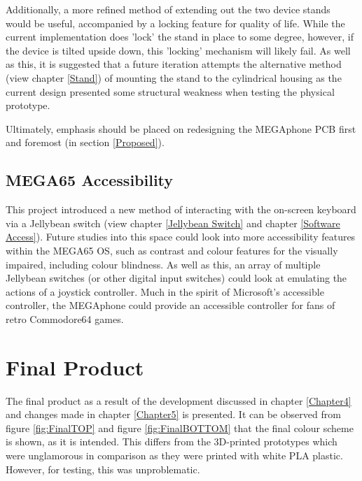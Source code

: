 Additionally, a more refined method of extending out the two device stands would be useful, accompanied by a locking feature for quality of life.
While the current implementation does 'lock' the stand in place to some degree, however, if the device is tilted upside down, this 'locking' mechanism will likely fail.
As well as this, it is suggested that a future iteration attempts the alternative method (view chapter \ref{Stand}) of mounting the stand to the cylindrical housing as the current design presented some structural weakness when testing the physical prototype.

Ultimately, emphasis should be placed on redesigning the MEGAphone PCB first and foremost (in section \ref{Proposed}).

\subsection{MEGA65 Accessibility}

This project introduced a new method of interacting with the on-screen keyboard via a Jellybean switch (view chapter \ref{Jellybean Switch} and chapter \ref{Software Access}).
Future studies into this space could look into more accessibility features within the MEGA65 OS, such as contrast and colour features for the visually impaired, including colour blindness.
As well as this, an array of multiple Jellybean switches (or other digital input switches) could look at emulating the actions of a joystick controller.
Much in the spirit of Microsoft's accessible controller, the MEGAphone could provide an accessible controller for fans of retro Commodore64 games.


\section{Final Product}
The final product as a result of the development discussed in chapter \ref{Chapter4} and changes made in chapter \ref{Chapter5} is presented.
It can be observed from figure \ref{fig:FinalTOP} and figure \ref{fig:FinalBOTTOM} that the final colour scheme is shown, as it is intended.
This differs from the 3D-printed prototypes which were unglamorous in comparison as they were printed with white PLA plastic.
However, for testing, this was unproblematic.

